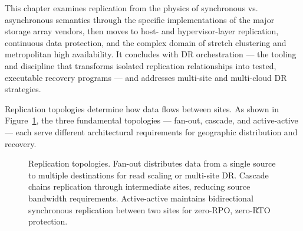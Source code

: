 This chapter examines replication from the physics of synchronous vs. asynchronous semantics through the specific implementations of the major storage array vendors, then moves to host- and hypervisor-layer replication, continuous data protection, and the complex domain of stretch clustering and metropolitan high availability. It concludes with DR orchestration --- the tooling and discipline that transforms isolated replication relationships into tested, executable recovery programs --- and addresses multi-site and multi-cloud DR strategies.

Replication topologies determine how data flows between sites. As shown in Figure~\ref{fig:replication-topologies}, the three fundamental topologies --- fan-out, cascade, and active-active --- each serve different architectural requirements for geographic distribution and recovery.

\begin{figure}[htbp]
\centering
{}
\caption{Replication topologies. Fan-out distributes data from a single source to multiple destinations for read scaling or multi-site DR. Cascade chains replication through intermediate sites, reducing source bandwidth requirements. Active-active maintains bidirectional synchronous replication between two sites for zero-RPO, zero-RTO protection.}
\label{fig:replication-topologies}
\end{figure}

